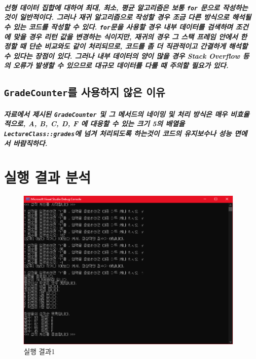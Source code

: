 \documentclass[UTF8]{report}
\begin{document}
            \paragraph{%
                \normalfont 선형 데이터 집합에 대하여 최대, 최소, 평균 알고리즘은 보통 \texttt{for} 문으로 작성하는 것이 일반적이다. 그러나 재귀 알고리즘으로 작성할 경우 조금 다른 방식으로 해석될 수 있는 코드를 작성할 수 있다. \texttt{for}문을 사용할 경우 내부 데이터를 검색하며 조건에 맞을 경우 리턴 값을 변경하는 식이지만, 재귀의 경우 그 스택 프레임 안에서 한정할 때 단순 비교와도 같이 처리되므로, 코드를 좀 더 직관적이고 간결하게 해석할 수 있다는 장점이 있다. 그러나 내부 데이터의 양이 많을 경우 Stack Overflow 등의 오류가 발생할 수 있으므로 대규모 데이터를 다룰 때 주의할 필요가 있다. 
            }   

            \section{\texttt{GradeCounter}를 사용하지 않은 이유}
            \paragraph{%
                \normalfont 자료에서 제시된 \texttt{GradeCounter} 및 그 메서드의 네이밍 및 처리 방식은 매우 비효율적으로, A, B, C, D, F 에 대응할 수 있는 크기 5의 배열을 \texttt{LectureClass::grades}에 넘겨 처리되도록 하는것이 코드의 유지보수나 성능 면에서 바람직하다.
            }

    \chapter{실행 결과 분석}
        \begin{figure}[h]
            \centering
            \includegraphics[width=\textwidth]{result_1.png}
            \caption{실행 결과1}
            \label{fig:result}
        \end{figure}
        
\end{document}
